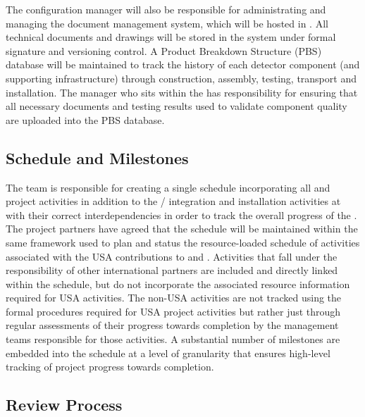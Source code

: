 The configuration manager will also be responsible for administrating
and managing the  document management system, which will
be hosted in .  All technical documents and drawings will be
stored in the  system under formal signature and
versioning control.  A Product Breakdown Structure (PBS) database will
be maintained to track the history of each detector  component (and supporting
infrastructure) through construction, assembly, testing, %
transport and installation.  The   manager who
sits within the  has responsibility for ensuring that all
necessary documents and testing results used to validate component
quality are uploaded into the PBS database.

\subsection{Schedule and Milestones}
\label{sec:dune_schedule}

The  team is responsible for creating a single
 schedule incorporating all  and
 project activities in addition to the
/ integration and installation activities at
 with their correct interdependencies in order to track
the overall progress of the .  The project partners have
agreed that the  schedule will be maintained within the same
 framework used to plan and status the resource-loaded
schedule of activities associated with the USA contributions to
 and .  Activities that fall under the
responsibility of other international partners are included and
directly linked within the  schedule, but do not incorporate
the associated resource information required for USA activities.  The
non-USA activities are not tracked using the formal 
procedures required for USA project activities but rather just through
regular assessments of their progress towards completion by the
management teams responsible for those activities.  A substantial
number of milestones are embedded into the schedule at a level of
granularity that ensures high-level tracking of project progress
towards completion.

\subsection{Review Process}
\label{sec:dune_review}


